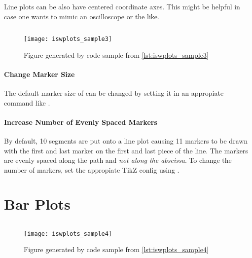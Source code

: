 \documentclass{scrartcl}
\begin{document}
Line plots can be also have centered coordinate axes.
This might be helpful in case one wants to mimic an oscilloscope or the like.

\begin{listing}[H]
  \inputminted{latex}{iswplots_sample3.tikz}
  \caption{Code sample for the figure shown in \cref{fig:iswplots_sample3}}
  \label{lst:iswplots_sample3}
\end{listing}

\begin{figure}[H]
  \centering
  \smaller
  \texttt{[image: iswplots\_sample3]}
  \caption{%
    Figure generated by code sample from \cref{lst:iswplots_sample3}
  }
  \label{fig:iswplots_sample3}
\end{figure}




\paragraph{Change Marker Size}
The default marker size of \latexinline{0.45ex} can be changed by setting it in an appropiate  command like \latexinline{\tikzset{isw marker size=0.45ex}}.


\paragraph{Increase Number of Evenly Spaced Markers}
By default, 10 segments are put onto a line plot causing 11 markers to be drawn with the first and last marker on the first and last piece of the line.
The markers are evenly spaced along the path and \emph{not along the abscissa}.
To change the number of markers, set the appropiate TikZ config using \latexinline{\tikzset{isw marker count=50}}.


\section{Bar Plots}

\begin{listing}[H]
  \inputminted{latex}{iswplots_sample4.tikz}
  \caption{Code sample for the figure shown in \cref{fig:iswplots_sample4}}
  \label{lst:iswplots_sample4}
\end{listing}

\begin{figure}[H]
  \centering
  \smaller
  \texttt{[image: iswplots\_sample4]}
  \caption{%
    Figure generated by code sample from \cref{lst:iswplots_sample4}
  }
  \label{fig:iswplots_sample4}
\end{figure}
\end{document}
